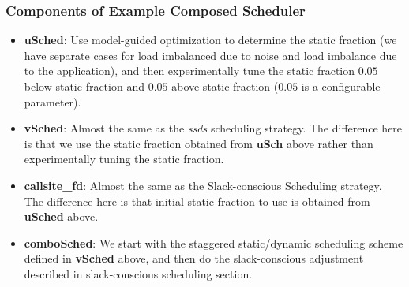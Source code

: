 \begin{frame}[label=combinedSched]
\frametitle{Components of Example Composed Scheduler}
\begin{itemize}
\small \item \small \textbf{uSched}: Use model-guided optimization
  to determine the static fraction (we have separate cases for load
  imbalanced due to noise and load imbalance due to the application), 
  and then experimentally tune the static fraction $0.05$ below static
  fraction and $0.05$ above static fraction ($0.05$ is a configurable
  parameter). 
\item \small \textbf{vSched}: Almost the same as the \textit{ssds}
  scheduling strategy. The difference here is that we use the 
  static fraction obtained from \textbf{uSch} above
  rather than experimentally tuning the static fraction. 
\item \small \textbf{callsite\_fd}: Almost the same as the Slack-conscious Scheduling strategy. 
  The difference here is that initial static fraction to use is obtained from \textbf{uSched} above. 
\item \small \textbf{comboSched}: We start with the staggered static/dynamic
  scheduling scheme defined in \textbf{vSched} above, and then do the 
  slack-conscious adjustment described in slack-conscious scheduling section.
\end{itemize}
\end{frame} 


